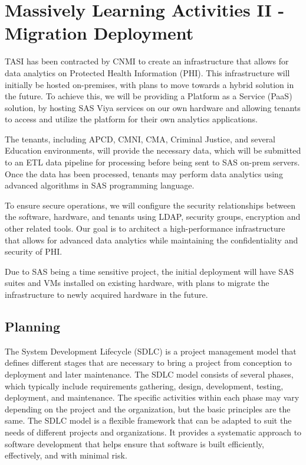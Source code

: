 \section{Massively Learning Activities II - Migration Deployment} \label{section: MLA2}
TASI has been contracted by CNMI to create an infrastructure that allows for data analytics on Protected Health Information (PHI). This infrastructure will initially be hosted on-premises, with plans to move towards a hybrid solution in the future. To achieve this, we will be providing a Platform as a Service (PaaS) solution, by hosting SAS Viya services on our own hardware and allowing tenants to access and utilize the platform for their own analytics applications.

The tenants, including APCD, CMNI, CMA, Criminal Justice, and several Education environments, will provide the necessary data, which will be submitted to an ETL data pipeline for processing before being sent to SAS on-prem servers. Once the data has been processed, tenants may perform data analytics using advanced algorithms in SAS programming language.

To ensure secure operations, we will configure the security relationships between the software, hardware, and tenants using LDAP, security groups, encryption  and other related tools. Our goal is to architect a high-performance infrastructure that allows for advanced data analytics while maintaining the confidentiality and security of PHI.

Due to SAS being a time sensitive project, the initial deployment will have SAS suites and VMs installed on existing hardware, with plans to migrate the infrastructure to newly acquired hardware in the future.

\subsection{Planning}

The System Development Lifecycle (SDLC) is a project management model that defines different stages that are necessary to bring a project from conception to deployment and later maintenance. The SDLC model consists of several phases, which typically include requirements gathering, design, development, testing, deployment, and maintenance. The specific activities within each phase may vary depending on the project and the organization, but the basic principles are the same. The SDLC model is a flexible framework that can be adapted to suit the needs of different projects and organizations. It provides a systematic approach to software development that helps ensure that software is built efficiently, effectively, and with minimal risk.

